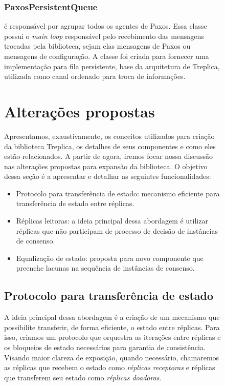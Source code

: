 \begin{figure}[ht]
\subsubsection{PaxosPersistentQueue}

 é responsável por agrupar todos os agentes de Paxos.
Essa classe possui o \emph{main loop} responsável pelo recebimento das mensagens trocadas
pela biblioteca, sejam elas mensagens de Paxos ou mensagens de configuração. A classe
 foi criada para fornecer uma implementação para fila
persistente, base da arquitetura de Treplica, utilizada como canal ordenado para troca de
informações.


\section{Alterações propostas}\label{sec:alteracoes_propostas}

Apresentamos, exaustivamente, os conceitos utilizados para criação da biblioteca Treplica,
os detalhes de seus componentes e como eles estão relacionados. A partir de agora, iremos
focar nossa discussão nas alterações propostas para expansão da biblioteca. O objetivo
dessa seção é a apresentar e detalhar as seguintes funcionalidades:

\begin{itemize}
  \item Protocolo para transferência de estado: mecanismo eficiente para transferência de
    estado entre réplicas.
  \item Réplicas leitoras: a ideia principal dessa abordagem é utilizar réplicas que não
    participam de processo de decisão de instâncias de consenso.
  \item Equalização de estado: proposta para novo componente que preenche lacunas na
    sequência de instâncias de consenso.
\end{itemize}

\subsection{Protocolo para transferência de estado}

A ideia principal dessa abordagem é a criação de um mecanismo que possibilite transferir, de
forma eficiente, o estado entre réplicas. Para isso, criamos um protocolo que orquestra as
iterações entre réplicas e os bloqueios de estado necessários para garantia de
consistência. Visando maior clareza de exposição, quando necessário, chamaremos as
réplicas que recebem o estado como \emph{réplicas receptoras} e réplicas que transferem
seu estado como \emph{réplicas doadoras}.


\end{figure}
